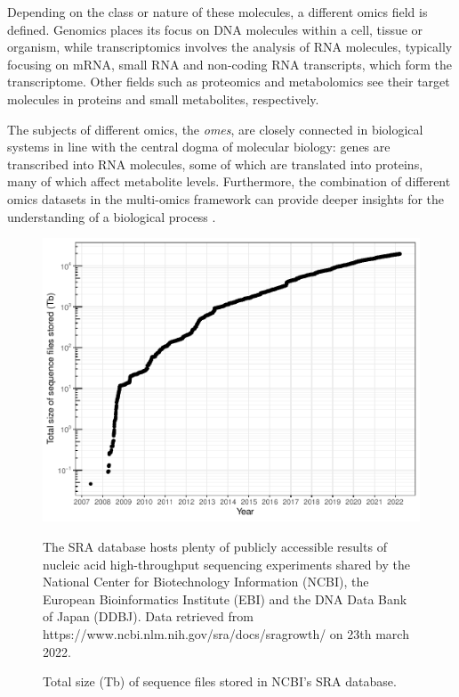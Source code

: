 \documentclass[
  openany]{book}
\begin{document}
Depending on the class or nature of these molecules, a different omics field is defined. Genomics places its focus on DNA molecules within a cell, tissue or organism, while transcriptomics involves the analysis of RNA molecules, typically focusing on mRNA, small RNA and non-coding RNA transcripts, which form the transcriptome. Other fields such as proteomics and metabolomics see their target molecules in proteins and small metabolites, respectively.

The subjects of different omics, the \emph{omes}, are closely connected in biological systems in line with the central dogma of molecular biology: genes are transcribed into RNA molecules, some of which are translated into proteins, many of which affect metabolite levels. Furthermore, the combination of different omics datasets in the multi-omics framework can provide deeper insights for the understanding of a biological process \autocite{Krassowski2020}.

\begin{figure}[!htbp]

\begin{center}\includegraphics[width=0.8\linewidth]{_main_files/figure-latex/sra-tb-1} \end{center}

\caption{Total size (Tb) of sequence files stored in NCBI's SRA database. \label{fig:sra-tb}}
The SRA database hosts plenty of publicly accessible results of nucleic acid high-throughput sequencing experiments shared by the National Center for Biotechnology Information (NCBI), the European Bioinformatics Institute (EBI) and the DNA Data Bank of Japan (DDBJ). Data retrieved from https://www.ncbi.nlm.nih.gov/sra/docs/sragrowth/ on 23th march 2022.
\end{figure}
\end{document}
